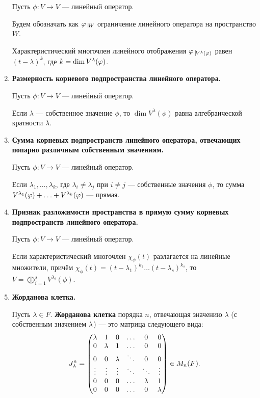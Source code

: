 \begin{enumerate}
Пусть $\phi\colon V \rightarrow V$ --- линейный оператор.

Будем обозначать как $\phi \; \vline_{W}$ ограничение линейного оператора на пространство $W$.

Характеристический многочлен линейного отображения $\phi \; \vline_{V^{\lambda}(\phi)}$ равен $(t - \lambda)^{k}$, где $k \hm= \dim V^\l (\phi)$.

\item \textbf{Размерность корневого подпространства линейного оператора.}

Пусть $\phi\colon V \rightarrow V$ --- линейный оператор.

Если $\lambda$ --- собственное значение $\phi$, то $\dim{V^{\lambda}(\phi)}$ равна алгебраической кратности $\lambda$.

\item \textbf{Сумма корневых подпространств линейного оператора, отвечающих попарно различным собственным значениям.}

Пусть $\phi\colon V \rightarrow V$ --- линейный оператор.

Если $\lambda_1, \ldots, \lambda_k$, где $\lambda_i \neq \lambda_j$ при $i \neq j$ --- собственные значения $\phi$, то сумма $V^{\lambda_1}(\phi) + \ldots \hm+ V^{\lambda_k}(\phi)$ --- прямая.

\item \textbf{Признак разложимости пространства в прямую сумму корневых подпространств линейного оператора.}

Пусть $\phi\colon V \rightarrow V$ --- линейный оператор.

Если характеристический многочлен $\chi_\phi(t)$ разлагается на линейные множители, причём $\chi_\phi(t) = (t - \lambda_1)^{k_1}\ldots(t - \lambda_s)^{k_s}$, то $V = \bigoplus_{i = 1}^s  V^{\lambda_i}(\phi)$.

\item \textbf{Жорданова клетка.}

Пусть $\lambda \in F$. \textbf{Жорданова клетка} порядка $n$, отвечающая значению $\lambda$ (с собственным значением $\lambda $) --- это матрица следующего вида:
\begin{gather*}
J_\lambda^n = 
\begin{pmatrix}
\lambda & 1 & 0 & \ldots & 0 & 0 \\
0 & \lambda & 1 & \ldots & 0 & 0 \\
0 & 0 & \lambda & \ddots & 0 & 0 \\
\vdots & \vdots & \vdots & \ddots & \ddots & \vdots \\
0 & 0 & 0 & \ldots & \lambda & 1 \\
0 & 0 & 0 & \ldots & 0 & \lambda
\end{pmatrix} \in M_n(F).
\end{gather*}


\end{enumerate}
